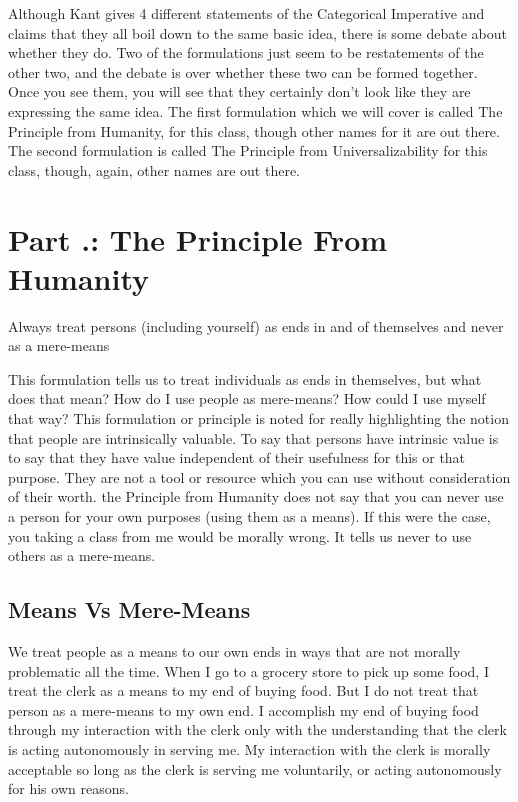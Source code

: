 Although Kant gives 4 different statements of the Categorical Imperative and claims that they all boil down to the same basic idea, there is some debate about whether they do. Two of the formulations just seem to be restatements of the other two, and the debate is over whether these two can be formed together. Once you see them, you will see that they certainly don't look like they are expressing the same idea. The first formulation which we will cover is called The Principle from Humanity, for this class, though other names for it are out there. The second formulation is called The Principle from Universalizability for this class, though, again, other names are out there.

\section{Part \thechapcount.\theseccount: The Principle From Humanity}
\begin{center}
Always treat persons (including yourself) as ends in and of themselves and never as a mere-means
\end{center}
This formulation tells us to treat individuals as ends in themselves, but what does that mean? How do I use people as mere-means? How could I use myself that way? This formulation or principle is noted for really highlighting the notion that people are intrinsically valuable. To say that persons have intrinsic value is to say that they have value independent of their usefulness for this or that purpose.  They are not a tool or resource which you can use without consideration of their worth. the Principle from Humanity does not say that you can never use a person for your own purposes (using them as a means). If this were the case, you taking a class from me would be morally wrong. It tells us never to use others as a mere-means.

\subsection{Means Vs Mere-Means}

We treat people as a means to our own ends in ways that are not morally problematic all the time. When I go to a grocery store to pick up some food, I treat the clerk as a means to my end of buying food. But I do not treat that person as a mere-means to my own end. I accomplish my end of buying food through my interaction with the clerk only with the understanding that the clerk is acting autonomously in serving me. My interaction with the clerk is morally acceptable so long as the clerk is serving me voluntarily, or acting autonomously for his own reasons.

